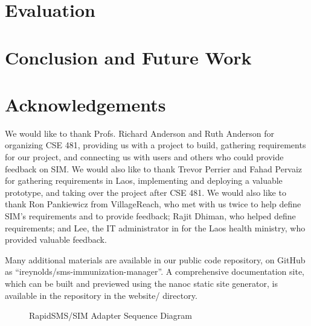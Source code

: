 \documentclass{acm_proc_article-sp}
\begin{document}
\section{Evaluation}

\section{Conclusion and Future Work}

\section{Acknowledgements}

We would like to thank Profs. Richard Anderson and Ruth Anderson for organizing CSE 481, providing us with a project to build, gathering requirements for our project, and connecting us with users and others who could provide feedback on SIM. We would also like to thank Trevor Perrier and Fahad Pervaiz for gathering requirements in Laos, implementing and deploying a valuable prototype, and taking over the project after CSE 481. We would also like to thank Ron Pankiewicz from VillageReach, who met with us twice to help define SIM's requirements and to provide feedback; Rajit Dhiman, who helped define requirements; and Lee, the IT administrator in for the Laos health ministry, who provided valuable feedback.


  
\balancecolumns

\appendix
Many additional materials are available in our public code repository, on GitHub as ``ireynolds/sms-immunization-manager''. A comprehensive documentation site, which can be built and previewed using the nanoc static site generator, is available in the repository in the website/ directory.

\begin{figure*}
\centering
{}
\caption{RapidSMS/SIM Adapter Sequence Diagram}
\end{figure*}
\end{document}
